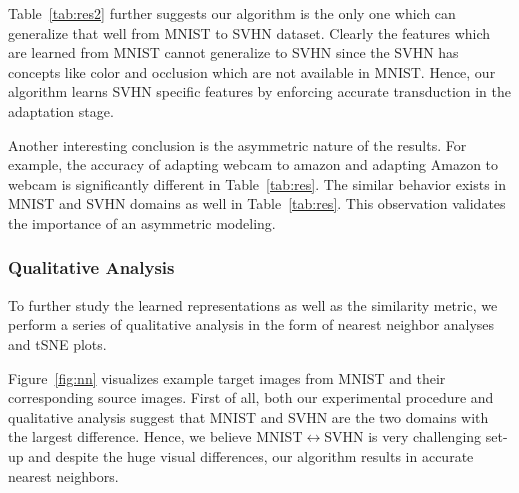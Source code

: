 Table~\ref{tab:res2} further suggests our algorithm is the only one which can generalize that well from MNIST to SVHN dataset. Clearly the features which are learned from MNIST cannot generalize to SVHN since the SVHN has concepts like color and occlusion which are not available in MNIST. Hence, our algorithm learns SVHN specific features by enforcing accurate transduction in the adaptation stage.

Another interesting conclusion is the asymmetric nature of the results. For example, the accuracy of adapting webcam to amazon and adapting Amazon to webcam is significantly different in Table~\ref{tab:res}. The similar behavior exists in MNIST and SVHN domains as well in Table~\ref{tab:res}. This observation validates the importance of an asymmetric modeling.

\subsubsection{Qualitative Analysis}
To further study the learned representations as well as the similarity metric, we perform a series of qualitative analysis in the form of nearest neighbor analyses and tSNE\cite{tsne} plots.

Figure~\ref{fig:nn} visualizes example target images from MNIST and their corresponding source images. First of all, both our experimental procedure and qualitative analysis suggest that MNIST and SVHN are the two domains with the largest difference. Hence, we believe MNIST$\leftrightarrow$SVHN is very challenging set-up and despite the huge visual differences, our algorithm results in accurate nearest neighbors.

